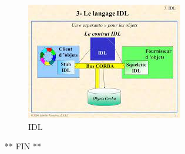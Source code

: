 \vspace*{2cm}

\begin{figure}[h]
        \centering
     \includegraphics[scale= 1]{IDL/3}
        \caption{IDL}
\end{figure}

\pagebreak
\vspace*{9cm}
\begin{center}
   \Huge{** FIN **}
\end{center}